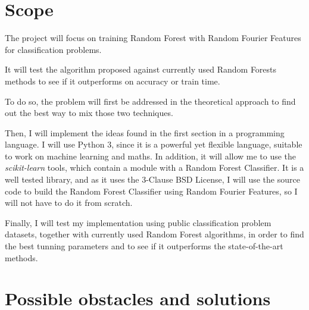 \documentclass[a4paper]{article}
\begin{document}
    \section{Scope}

    The project will focus on training Random Forest with Random Fourier Features for classification problems.

    It will test the algorithm proposed against currently used Random Forests methods to see if it outperforms on accuracy or train time.

    To do so, the problem will first be addressed in the theoretical approach to find out the best way to mix those two techniques.

    Then, I will implement the ideas found in the first section in a programming language. I will use Python 3, since it is a powerful yet flexible language, suitable to work on machine learning and maths. In addition, it will allow me to use the \textit{scikit-learn} tools\cite{scikit-learn}, which contain a module with a Random Forest Classifier. It is a well tested library, and as it uses the 3-Clause BSD License, I will use the source code to build the Random Forest Classifier using Random Fourier Features, so I will not have to do it from scratch.

    Finally, I will test my implementation using public classification problem datasets, together with currently used Random Forest algorithms, in order to find the best tunning parameters and to see if it outperforms the state-of-the-art methods.



    \section{Possible obstacles and solutions}
\end{document}
